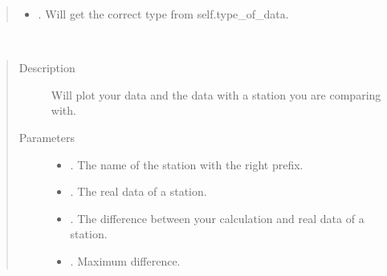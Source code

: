\documentclass[letterpaper,10pt,english]{sphinxmanual}
\begin{document}
\begin{fulllineitems}
\begin{fulllineitems}
\begin{quote}
\begin{description}
\begin{itemize}
\item {} 
\sphinxAtStartPar
{} \textendash{} . Will get the correct type from self.type\_of\_data.

\end{itemize}

\end{description}\end{quote}

\end{fulllineitems}


\begin{fulllineitems}
\label{\detokenize{DwdPlotter:DwdPlotter.PlotterForData.plotting_compare}}~\begin{quote}\begin{description}
\item[{Description}] \leavevmode
\sphinxAtStartPar
Will plot your data and the data with a station you are comparing with.

\item[{Parameters}] \leavevmode\begin{itemize}
\item {} 
\sphinxAtStartPar
{} \textendash{} . The name of the station with the right prefix.

\item {} 
\sphinxAtStartPar
{} \textendash{} . The real data of a station.

\item {} 
\sphinxAtStartPar
{} \textendash{} . The difference between your calculation and real data of a station.

\item {} 
\sphinxAtStartPar
{} \textendash{} . Maximum difference.


\end{itemize}
\end{description}
\end{quote}
\end{fulllineitems}
\end{fulllineitems}
\end{document}
